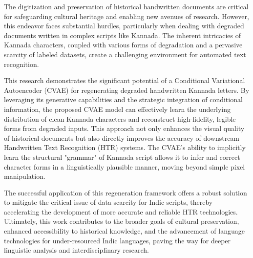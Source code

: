 \documentclass[conference]{IEEEtran}
\begin{document}
\justify
The digitization and preservation of historical handwritten documents are critical for safeguarding cultural heritage and enabling new avenues of research. However, this endeavor faces substantial hurdles, particularly when dealing with degraded documents written in complex scripts like Kannada. The inherent intricacies of Kannada characters, coupled with various forms of degradation and a pervasive scarcity of labeled datasets, create a challenging environment for automated text recognition.

This research demonstrates the significant potential of a Conditional Variational Autoencoder (CVAE) for regenerating degraded handwritten Kannada letters. By leveraging its generative capabilities and the strategic integration of conditional information, the proposed CVAE model can effectively learn the underlying distribution of clean Kannada characters and reconstruct high-fidelity, legible forms from degraded inputs. This approach not only enhances the visual quality of historical documents but also directly improves the accuracy of downstream Handwritten Text Recognition (HTR) systems. The CVAE's ability to implicitly learn the structural "grammar" of Kannada script allows it to infer and correct character forms in a linguistically plausible manner, moving beyond simple pixel manipulation.

The successful application of this regeneration framework offers a robust solution to mitigate the critical issue of data scarcity for Indic scripts, thereby accelerating the development of more accurate and reliable HTR technologies. Ultimately, this work contributes to the broader goals of cultural preservation, enhanced accessibility to historical knowledge, and the advancement of language technologies for under-resourced Indic languages, paving the way for deeper linguistic analysis and interdisciplinary research.



\end{document}
